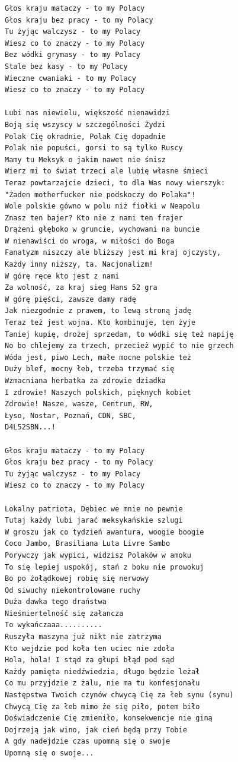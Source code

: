 \documentclass[12pt]{article}
\begin{document}
\begin{verbatim}
Głos kraju mataczy - to my Polacy
Głos kraju bez pracy - to my Polacy
Tu żyjąc walczysz - to my Polacy
Wiesz co to znaczy - to my Polacy
Bez wódki grymasy - to my Polacy
Stale bez kasy - to my Polacy
Wieczne cwaniaki - to my Polacy
Wiesz co to znaczy - to my Polacy

Lubi nas niewielu, większość nienawidzi
Boją się wszyscy w szczególności Żydzi
Polak Cię okradnie, Polak Cię dopadnie
Polak nie popuści, gorsi to są tylko Ruscy
Mamy tu Meksyk o jakim nawet nie śnisz
Wierz mi to świat trzeci ale lubię własne śmieci
Teraz powtarzajcie dzieci, to dla Was nowy wierszyk:
"Żaden motherfucker nie podskoczy do Polaka"!
Wole polskie gówno w polu niż fiołki w Neapolu
Znasz ten bajer? Kto nie z nami ten frajer
Drążeni głęboko w gruncie, wychowani na buncie
W nienawiści do wroga, w miłości do Boga
Fanatyzm niszczy ale bliższy jest mi kraj ojczysty,
Każdy inny niższy, ta. Nacjonalizm!
W górę ręce kto jest z nami
Za wolność, za kraj sieg Hans 52 gra
W górę pięści, zawsze damy radę
Jak niezgodnie z prawem, to lewą stroną jadę
Teraz też jest wojna. Kto kombinuje, ten żyje
Taniej kupię, drożej sprzedam, to wódki się też napiję
No bo chlejemy za trzech, przecież wypić to nie grzech
Wóda jest, piwo Lech, małe mocne polskie też
Duży blef, mocny łeb, trzeba trzymać się
Wzmacniana herbatka za zdrowie dziadka
I zdrowie! Naszych polskich, pięknych kobiet
Zdrowie! Nasze, wasze, Centrum, RW,
Łyso, Nostar, Poznań, CDN, SBC,
D4L52SBN...!

Głos kraju mataczy - to my Polacy
Głos kraju bez pracy - to my Polacy
Tu żyjąc walczysz - to my Polacy
Wiesz co to znaczy - to my Polacy

Lokalny patriota, Dębiec we mnie no pewnie
Tutaj każdy lubi jarać meksykańskie szlugi
W groszu jak co tydzień awantura, woogie boogie
Coco Jambo, Brasiliana Luta Livre Sambo
Porywczy jak wypici, widzisz Polaków w amoku
To się lepiej uspokój, stań z boku nie prowokuj
Bo po żołądkowej robię się nerwowy
Od siwuchy niekontrolowane ruchy
Duża dawka tego draństwa
Nieśmiertelność się załancza
To wykańczaaa..........
Ruszyła maszyna już nikt nie zatrzyma
Kto wejdzie pod koła ten uciec nie zdoła
Hola, hola! I stąd za głupi błąd pod sąd
Każdy pamięta niedźwiedzia, długo będzie leżał
Co mu przyjdzie z żalu, nie ma tu konfesjonału
Następstwa Twoich czynów chwycą Cię za łeb synu (synu)
Chwycą Cię za łeb mimo że się piło, potem biło
Doświadczenie Cię zmieniło, konsekwencje nie giną
Dojrzeją jak wino, jak cień będą przy Tobie
A gdy nadejdzie czas upomną się o swoje
Upomną się o swoje...


\end{verbatim}
\end{document}
